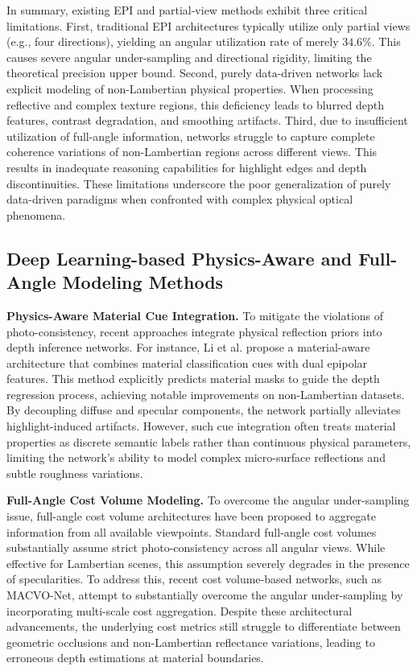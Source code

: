 \documentclass[lettersize,journal]{IEEEtran}
\begin{document}
In summary, existing EPI and partial-view methods exhibit three critical limitations. First, traditional EPI architectures typically utilize only partial views (e.g., four directions), yielding an angular utilization rate of merely $34.6\%$. This causes severe angular under-sampling and directional rigidity, limiting the theoretical precision upper bound. Second, purely data-driven networks lack explicit modeling of non-Lambertian physical properties. When processing reflective and complex texture regions, this deficiency leads to blurred depth features, contrast degradation, and smoothing artifacts. Third, due to insufficient utilization of full-angle information, networks struggle to capture complete coherence variations of non-Lambertian regions across different views. This results in inadequate reasoning capabilities for highlight edges and depth discontinuities. These limitations underscore the poor generalization of purely data-driven paradigms when confronted with complex physical optical phenomena.

\subsection{Deep Learning-based Physics-Aware and Full-Angle Modeling Methods}

\textbf{Physics-Aware Material Cue Integration.}
To mitigate the violations of photo-consistency, recent approaches integrate physical reflection priors into depth inference networks. For instance, Li et al. \cite{li2021} propose a material-aware architecture that combines material classification cues with dual epipolar features. This method explicitly predicts material masks to guide the depth regression process, achieving notable improvements on non-Lambertian datasets. By decoupling diffuse and specular components, the network partially alleviates highlight-induced artifacts. However, such cue integration often treats material properties as discrete semantic labels rather than continuous physical parameters, limiting the network's ability to model complex micro-surface reflections and subtle roughness variations.

\textbf{Full-Angle Cost Volume Modeling.}
To overcome the angular under-sampling issue, full-angle cost volume architectures have been proposed to aggregate information from all available viewpoints. Standard full-angle cost volumes substantially assume strict photo-consistency across all angular views. While effective for Lambertian scenes, this assumption severely degrades in the presence of specularities. To address this, recent cost volume-based networks, such as MACVO-Net, attempt to substantially overcome the angular under-sampling by incorporating multi-scale cost aggregation. Despite these architectural advancements, the underlying cost metrics still struggle to differentiate between geometric occlusions and non-Lambertian reflectance variations, leading to erroneous depth estimations at material boundaries.
\end{document}
